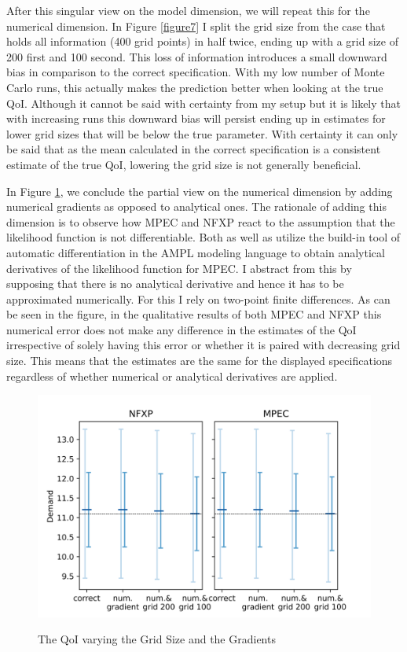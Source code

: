 After this singular view on the model dimension, we will repeat this for the numerical dimension. In Figure \ref{figure7} I split the grid size from the case that holds all information (400 grid points) in half twice, ending up with a grid size of 200 first and 100 second. This loss of information introduces a small downward bias in comparison to the correct specification. With my low number of Monte Carlo runs, this actually makes the prediction better when looking at the true QoI. Although it cannot be said with certainty from my setup but it is likely that with increasing runs this downward bias will persist ending up in estimates for lower grid sizes that will be below the true parameter. With certainty it can only be said that as the mean calculated in the correct specification is a consistent estimate of the true QoI, lowering the grid size is not generally beneficial.

In Figure \ref{figure8}, we conclude the partial view on the numerical dimension by adding numerical gradients as opposed to analytical ones. The rationale of adding this dimension is to observe how MPEC and NFXP react to the assumption that the likelihood function is not differentiable. Both \cite{Su.Judd.2012} as well as \cite{Iskhakov.2016} utilize the build-in tool of automatic differentiation in the AMPL modeling language to obtain analytical derivatives of the likelihood function for MPEC. I abstract from this by supposing that there is no analytical derivative and hence it has to be approximated numerically. For this I rely on two-point finite differences. As can be seen in the figure, in the qualitative results of both MPEC and NFXP this numerical error does not make any difference in the estimates of the QoI irrespective of solely having this error or whether it is paired with decreasing grid size. This means that the estimates are the same for the displayed specifications regardless of whether numerical or analytical derivatives are applied.

\begin{figure}[!t]
	\caption{The QoI varying the Grid Size and the Gradients}
	\vspace*{-4mm}
	\centering
	\includegraphics[scale=0.9]{../figures/figure_8.png}
	\label{figure8}
\end{figure}

